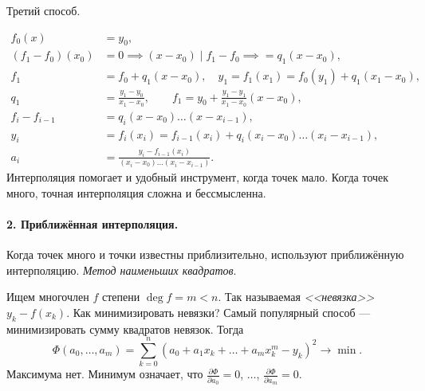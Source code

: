 Третий способ.

 
\begin{align*}
  f_0(x) &= y_0,\\
  (f_1-f_0)(x_0) &= 0 \implies (x-x_0) \mid f_1-f_0 \implies = q_1(x-x_0),\\
  f_1&= f_0 + q_1(x-x_0), \quad y_1 = f_1(x_1) = f_0(y_1) + q_1(x_1-x_0),\\
  q_1 &= \frac{y_1 - y_0}{x_1 -x_0}, \qquad f_1 = y_0 + \frac{y_1
  -y_1}{x_1-x_0}(x-x_0),\\
    f_i - f_{i-1} &= q_i(x-x_0)\ldots (x-x_{i-1}),\\
    y_i &= f_i(x_i) = f_{i-1}(x_i) + q_i(x_i-x_0) \ldots (x_i - x_{i-1}),\\
    a_i &= \frac{y_i - f_{i-1}(x_i)}{(x_i-x_0)\ldots(x_i-x_{i-1})}.
\end{align*}
Интерполяция помогает и удобный инструмент, когда точек мало. Когда точек много,
точная интерполяция сложна и бессмысленна.

\paragraph{2. Приближённая интерполяция.} Когда точек много и точки известны
приблизительно, используют приближённую интерполяцию. \emph{Метод наименьших
квадратов}.

Ищем многочлен $ f $ степени $ \deg f = m < n $. Так называемая \emph{<<невязка>>}
$ y_k - f(x_k) $. Как минимизировать невязки? Самый популярный способ ---
минимизировать сумму квадратов невязок. Тогда  
\[
  \Phi(a_0, \ldots, a_m) = \sum_{k=0}^n (a_0 + a_1 x_k + \ldots + a_m x_k^m -
  y_k)^2 \to \min.
\]
Максимума нет. Минимум означает, что $ \frac{\partial \Phi}{\partial a_0} = 0 $,
$ \ldots $, $ \frac{\partial \Phi}{\partial a_m} = 0 $.


